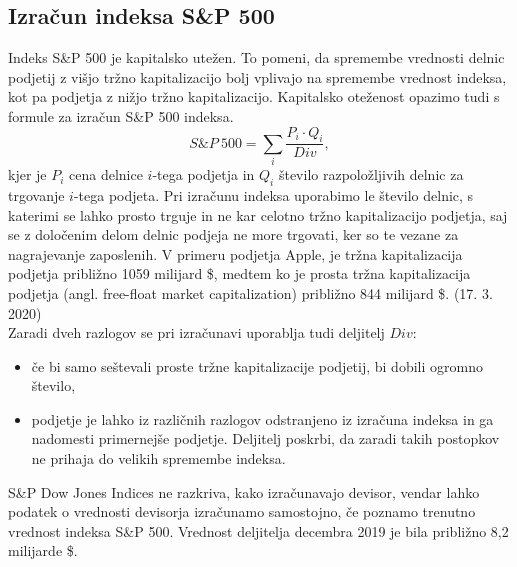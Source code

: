 \documentclass[12pt,a4paper]{amsart}
\theoremstyle{definition} %
\theoremstyle{plain} %
\begin{document}
\subsection{Izračun indeksa S\&P 500}
Indeks S\&P 500 je kapitalsko utežen. To pomeni, da spremembe vrednosti delnic podjetij z višjo tržno kapitalizacijo bolj vplivajo na spremembe vrednost indeksa, kot pa podjetja z nižjo tržno kapitalizacijo. Kapitalsko oteženost opazimo tudi s formule za izračun S\&P 500 indeksa.
$$
S\&P~500 = \sum_{i}^{}\frac{P_i \cdot{} Q_i}{Div},
$$
kjer je $P_i$ cena delnice $i$-tega podjetja in $Q_i$ število razpoložljivih delnic za trgovanje $i$-tega podjeta. Pri izračunu indeksa uporabimo le število delnic, s katerimi se lahko prosto trguje in ne kar celotno tržno kapitalizacijo podjetja, saj se z določenim delom delnic podjeja ne more trgovati, ker so te vezane za nagrajevanje zaposlenih. V primeru podjetja Apple, je tržna kapitalizacija podjetja približno 1059 milijard \$, medtem ko je prosta tržna kapitalizacija podjetja (angl. free-float market capitalization) približno 844 milijard \$. (17. 3. 2020)\\
Zaradi dveh razlogov se pri izračunavi uporablja tudi deljitelj $Div$:
\begin{itemize}
\item če bi samo seštevali proste tržne kapitalizacije podjetij, bi dobili ogromno število,
\item podjetje je lahko iz različnih razlogov odstranjeno iz izračuna indeksa in ga nadomesti primernejše podjetje. Deljitelj poskrbi, da zaradi takih postopkov ne prihaja do velikih spremembe indeksa.
\end{itemize}
 S\&P Dow Jones Indices ne razkriva, kako izračunavajo devisor, vendar lahko podatek o vrednosti devisorja izračunamo samostojno, če poznamo trenutno vrednost indeksa  S\&P 500. Vrednost deljitelja decembra 2019 je bila približno 8,2 milijarde \$.
\newpage
\end{document}
